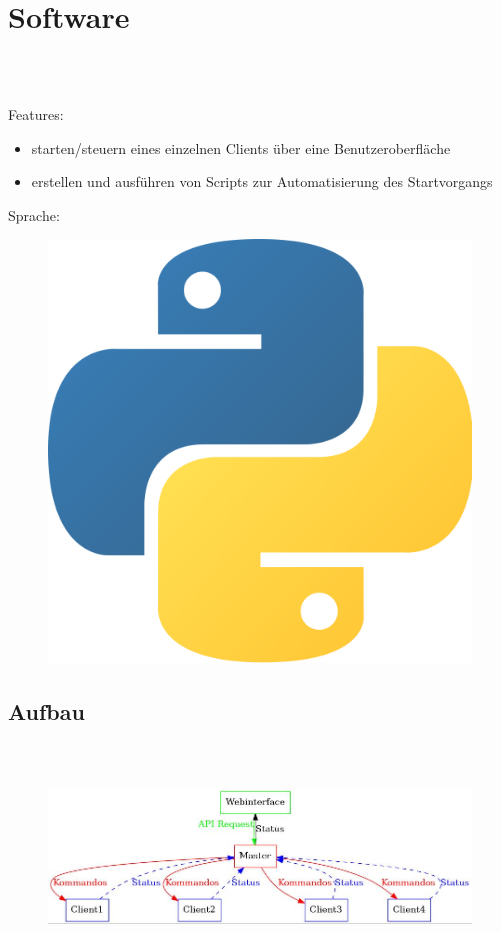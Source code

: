 \documentclass[accentcolor=tud1b,colorbacktitle,landscape,german,presentation]{tudbeamer}
\newcommand{\ftitle}{

	\frametitle{\insertsectionhead \\ {\small \insertsubsectionhead}}
}
\begin{document}
\section{Software}
\subsection{}
\begin{frame}
	\ftitle
	Features:
	\begin{itemize}
		\item starten/steuern eines einzelnen Clients über eine Benutzeroberfläche
		\item erstellen und ausführen von Scripts zur Automatisierung des Startvorgangs
	\end{itemize}
	\vspace{0.5cm}
	Sprache:
	\begin{figure}
		\centering
		\includegraphics[scale=0.05]{python}
	\end{figure}
\end{frame}

\subsection{Aufbau}
\begin{frame}
	\ftitle
	\begin{figure}
		\includegraphics[scale=0.35]{master-client}
	\end{figure}
\end{frame}
\end{document}
